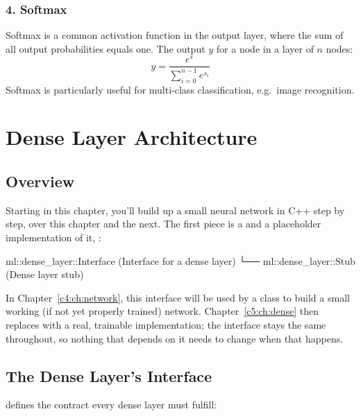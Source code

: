 \subsubsection{4. Softmax}
Softmax is a common activation function in the output layer, where the sum of all output
probabilities equals one. The output $y$ for a node in a layer of $n$ nodes:
\[
  y = \frac{e^s}{\sum_{i=0}^{n-1} e^{s_i}}
\]
Softmax is particularly useful for multi-class classification, e.g.\ image recognition.

\section{Dense Layer Architecture}
\label{c3:sec:dense}

\subsection{Overview}
Starting in this chapter, you'll build up a small neural network in C++ step by step, over this
chapter and the next. The first piece is a  and a placeholder
implementation of it, :

\begin{console}
ml::dense_layer::Interface   (Interface for a dense layer)
└── ml::dense_layer::Stub    (Dense layer stub)
\end{console}

\noindent In Chapter~\ref{c4:ch:network}, this interface will be used by a
 class to build a small working (if not yet properly trained) network.
Chapter~\ref{c5:ch:dense} then replaces  with a real, trainable implementation; the
interface stays the same throughout, so nothing that depends on it needs to change when that
happens.

\subsection{The Dense Layer's Interface}
 defines the contract every dense layer must fulfill:


